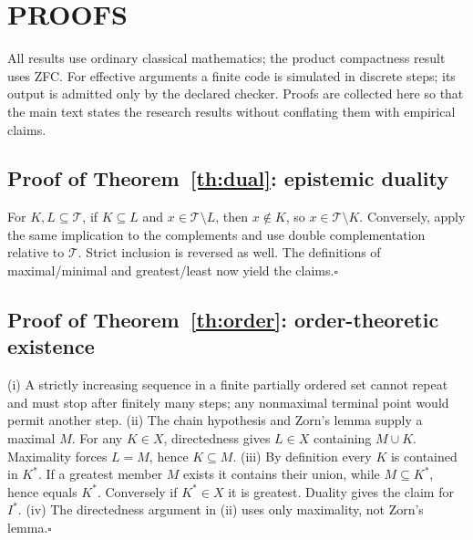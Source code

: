 \documentclass[11pt]{article}
\newcommand{\T}{\mathcal T}\newcommand{\K}{\mathcal K}\newcommand{\I}{\mathcal I}\newcommand{\A}{\mathcal A}
\begin{document}
\appendix
\section{PROOFS}
All results use ordinary classical mathematics; the product compactness result uses ZFC. For effective arguments a finite code is simulated in discrete steps; its output is admitted only by the declared checker. Proofs are collected here so that the main text states the research results without conflating them with empirical claims.

\subsection{Proof of Theorem~\ref{th:dual}: epistemic duality}\label{proof:dual}
For $K,L\subseteq\T$, if $K\subseteq L$ and $x\in\T\setminus L$, then $x\notin K$, so $x\in\T\setminus K$. Conversely, apply the same implication to the complements and use double complementation relative to $\T$. Strict inclusion is reversed as well. The definitions of maximal/minimal and greatest/least now yield the claims.\hfill$\square$

\subsection{Proof of Theorem~\ref{th:order}: order-theoretic existence}
(i) A strictly increasing sequence in a finite partially ordered set cannot repeat and must stop after finitely many steps; any nonmaximal terminal point would permit another step. (ii) The chain hypothesis and Zorn's lemma supply a maximal $M$. For any $K\in X$, directedness gives $L\in X$ containing $M\cup K$. Maximality forces $L=M$, hence $K\subseteq M$. (iii) By definition every $K$ is contained in $K^*$. If a greatest member $M$ exists it contains their union, while $M\subseteq K^*$, hence equals $K^*$. Conversely if $K^*\in X$ it is greatest. Duality gives the claim for $I^*$. (iv) The directedness argument in (ii) uses only maximality, not Zorn's lemma.\hfill$\square$
\end{document}
